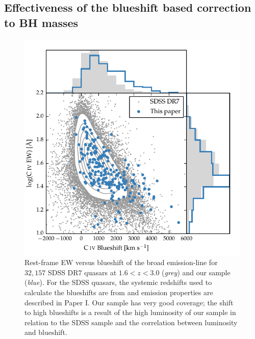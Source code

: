 \subsection{Effectiveness of the  blueshift based correction to BH masses}
\label{sec:effectiveness}

\begin{figure}
    \centering
    \includegraphics[width=\columnwidth]{figures/chapter03/civ_space.pdf} 
    \caption[{Rest-frame EW versus blueshift of the broad  emission-line for $32,157$ SDSS DR$7$ quasars at $1.6 < z < 3.0$ and our sample.}]{Rest-frame EW versus blueshift of the broad  emission-line for $32,157$ SDSS DR$7$ quasars at $1.6 < z < 3.0$ ({\it grey}) and our sample ({\it blue}). For the SDSS quasars, the systemic redshifts used to calculate the blueshifts are from \citet{hewett10} and  emission properties are described in Paper I. Our sample has very good coverage; the shift to high blueshifts is a result of the high luminosity of our sample in relation to the SDSS sample and the correlation between luminosity and blueshift.} 
    \label{fig:civ_space}
\end{figure}

